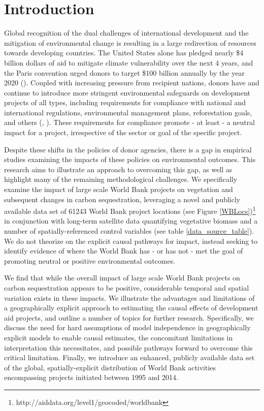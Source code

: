 \documentclass[sustainability,article,submit,moreauthors,pdftex,10pt,a4paper]{mdpi}
\begin{document}
\section{Introduction}

Global recognition of the dual challenges of international development and the mitigation of environmental change is resulting in a large redirection of resources towards developing countries. The United States alone has pledged nearly \$4 billion dollars of aid to mitigate climate vulnerability over the next 4 years, and the Paris convention urged donors to target \$100 billion annually by the year 2020 (\cite{royal_united_2015}). Coupled with increasing pressure from recipient nations, donors have and continue to introduce more stringent environmental safeguards on development projects of all types, including requirements for compliance with national and international regulations, environmental management plans, reforestation goals, and others (\cite{nielson_delegation_2003}, \cite{gutner_explaining_2005}). These requirements for compliance promote - at least - a neutral impact for a project, irrespective of the sector or goal of the specific project.
\par
Despite these shifts in the policies of donor agencies, there is a gap in empirical studies examining the impacts of these policies on environmental outcomes. This research aims to illustrate an approach to overcoming this gap, as well as highlight many of the remaining methodological challenges. We specifically examine the impact of large scale World Bank projects on vegetation and subsequent changes in carbon sequestration, leveraging a novel and publicly available data set of 61243 World Bank project locations (see Figure \ref{WBLocs})\footnote{http://aiddata.org/level1/geocoded/worldbank} in conjunction with long-term satellite data quantifying vegetative biomass and a number of spatially-referenced control variables (see table \ref{data_source_table}). We do not theorize on the explicit causal pathways for impact, instead seeking to identify evidence of where the World Bank has - or has not - met the goal of promoting neutral or positive environmental outcomes.

\par
We find that while the overall impact of large scale World Bank projects on carbon sequestration appears to be positive, considerable temporal and spatial variation exists in these impacts. We illustrate the advantages and limitations of a geographically explicit approach to estimating the causal effects of development aid projects, and outline a number of topics for further research. Specifically, we discuss the need for hard assumptions of model independence in geographically explicit models to enable causal estimates, the concomitant limitations in interpretation this necessitates, and possible pathways forward to overcome this critical limitation. Finally, we introduce an enhanced, publicly available data set of the global, spatially-explicit distribution of World Bank activities encompassing projects initiated between 1995 and 2014.
\end{document}
